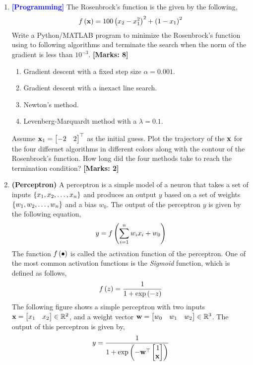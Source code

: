 \documentclass[12pt]{article}
\def\mf{\ensuremath\mathbf}
\def\mb{\ensuremath\mathbb}
\def\lp{\ensuremath\left(}
\def\rp{\ensuremath\right)}
\def\lc{\ensuremath\left\{}
\def\rc{\ensuremath\right\}}
\def\bmx{\ensuremath\begin{bmatrix*}[r]}
\def\emx{\ensuremath\end{bmatrix*}}
\newcommand{\ct}[1]{\lp #1\rp}
\begin{document}
\begin{enumerate}
    \item \textcolor{blue}{\textbf{[Programming]}} The Rosenbrock's function is the given by the following,
    \[ f\ct{\mf{x}} = 100\ct{x_2 - x_1^2}^2 + \ct{1 - x_1}^2 \]
    Write a Python/MATLAB program to minimize the Rosenbrock's function using to following algorithms and terminate the search when the norm of the gradient is less than $10^{-3}$. \textbf{[Marks: 8]}
    \begin{enumerate}
        \item Gradient descent with a fixed step size $\alpha = 0.001$.
        \item Gradient descent with a inexact line search.
        \item Newton's method.
        \item Levenberg-Marquardt method with a $\lambda = 0.1$.
    \end{enumerate}
    Assume $\mf{x}_1 = \bmx -2 & 2\emx^\top$ as the initial guess. Plot the trajectory of the $\mf{x}$ for the four differnet algorithms in different colors along with the contour of the Rosenbrock's function. How long did the four methods take to reach the termination condition? \textbf{[Marks: 2]}
    
    \item \textbf{(Perceptron)} A perceptron is a simple model of a neuron that takes a set of inputs $\lc x_1, x_2, \ldots, x_n\rc$ and produces an output $y$ based on a set of weights $\lc w_1, w_2, \ldots, w_n\rc$ and a bias $w_0$. The output of the perceptron $y$ is given by the following equation,
    \[ y = f\ct{\sum_{i=1}^n w_i x_i + w_0} \]
    The function $f\ct{\bullet}$ is called the activation function of the perceptron. One of the most common activation functions is the \textit{Sigmoid} function, which is defined as follows,
    \[ f\ct{z} = \frac{1}{1 + \exp\ct{-z}} \]
    The following figure shows a simple perceptron with two inputs $\mf{x} = \bmx x_1 & x_2\emx \in \mb{R}^2$, and a weight vector $\mf{w} = \bmx w_0 & w_1 & w_2 \emx \in \mb{R}^3$. The output of this perceptron is given by,
    \[ y = \frac{1}{1 + \exp\ct{-\mf{w}^\top \bmx 1 \\ \mf{x}\emx}} \]
    \begin{center}
        \begin{tikzpicture}[
            neuron/.style={circle, draw, minimum size=1cm},
            connection/.style={-stealth, thick},
            ]
        

\end{tikzpicture}
\end{center}
\end{enumerate}
\end{document}
